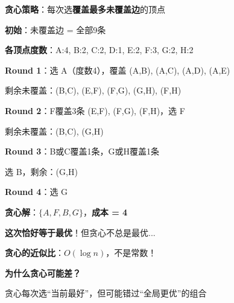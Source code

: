 \documentclass[12pt, a4paper]{ctexart}
\begin{document}
\begin{blackboard}

\textbf{贪心策略}：每次选\textbf{覆盖最多未覆盖边}的顶点

\textbf{初始}：未覆盖边 = 全部9条

\textbf{各顶点度数}：A:4, B:2, C:2, D:1, E:2, F:3, G:2, H:2

\textbf{Round 1}：选 A（度数4），覆盖 (A,B), (A,C), (A,D), (A,E)

剩余未覆盖：(B,C), (E,F), (F,G), (G,H), (F,H)

\textbf{Round 2}：F覆盖3条 (E,F), (F,G), (F,H)，选 F

剩余未覆盖：(B,C), (G,H)

\textbf{Round 3}：B或C覆盖1条，G或H覆盖1条

选 B，剩余：(G,H)

\textbf{Round 4}：选 G

\textbf{贪心解}：$\{A, F, B, G\}$，\textbf{成本 = 4}

\textbf{这次恰好等于最优}！但贪心不总是最优...

\end{blackboard}

\begin{blackboard}[贪心算法的问题]

\textbf{贪心的近似比}：$O(\log n)$，不是常数！

\textbf{为什么贪心可能差？}

贪心每次选``当前最好''，但可能错过``全局更优''的组合

\end{blackboard}
\end{document}
